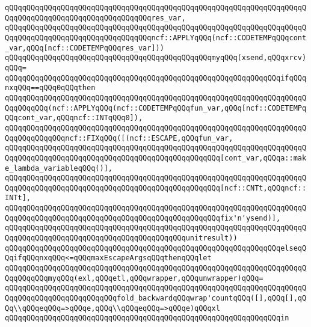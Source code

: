 \verb|qQQqqQQqqQQqqQQqqQQqqQQqqQQqqQQqqQQqqQQqqQQqqQQqqQQqqQQqqQQqqQQqqQQqqQQqqQQqqQQqqQQqqQQqqQQqqQQqqQQqqQQqres_var,|\newline
\verb|qQQqqQQqqQQqqQQqqQQqqQQqqQQqqQQqqQQqqQQqqQQqqQQqqQQqqQQqqQQqqQQqqQQqqQQqqQQqqQQqqQQqqQQqqQQqqQQqqQQqqQQqncf::APPLYqQQq(ncf::CODETEMPqQQqcont_var,qQQq[ncf::CODETEMPqQQqres_var]))|\newline
\verb|qQQqqQQqqQQqqQQqqQQqqQQqqQQqqQQqqQQqqQQqqQQqqQQqmyqQQq(xsend,qQQqxrcv)qQQq=|\newline
\verb|qQQqqQQqqQQqqQQqqQQqqQQqqQQqqQQqqQQqqQQqqQQqqQQqqQQqqQQqqQQqqQQqifqQQqnxqQQq==qQQq0qQQqthen|\newline
\verb|qQQqqQQqqQQqqQQqqQQqqQQqqQQqqQQqqQQqqQQqqQQqqQQqqQQqqQQqqQQqqQQqqQQqqQQqqQQqqQQq(ncf::APPLYqQQq(ncf::CODETEMPqQQqfun_var,qQQq[ncf::CODETEMPqQQqcont_var,qQQqncf::INTqQQq0]),|\newline
\verb|qQQqqQQqqQQqqQQqqQQqqQQqqQQqqQQqqQQqqQQqqQQqqQQqqQQqqQQqqQQqqQQqqQQqqQQqqQQqqQQqqQQqncf::FIXqQQq([(ncf::ESCAPE,qQQqfun_var,|\newline
\verb|qQQqqQQqqQQqqQQqqQQqqQQqqQQqqQQqqQQqqQQqqQQqqQQqqQQqqQQqqQQqqQQqqQQqqQQqqQQqqQQqqQQqqQQqqQQqqQQqqQQqqQQqqQQqqQQqqQQqqQQq[cont_var,qQQqa::make_lambda_variableqQQq()],|\newline
\verb|qQQqqQQqqQQqqQQqqQQqqQQqqQQqqQQqqQQqqQQqqQQqqQQqqQQqqQQqqQQqqQQqqQQqqQQqqQQqqQQqqQQqqQQqqQQqqQQqqQQqqQQqqQQqqQQqqQQqqQQq[ncf::CNTt,qQQqncf::INTt],|\newline
\verb|qQQqqQQqqQQqqQQqqQQqqQQqqQQqqQQqqQQqqQQqqQQqqQQqqQQqqQQqqQQqqQQqqQQqqQQqqQQqqQQqqQQqqQQqqQQqqQQqqQQqqQQqqQQqqQQqqQQqqQQqfix'n'ysend)],|\newline
\verb|qQQqqQQqqQQqqQQqqQQqqQQqqQQqqQQqqQQqqQQqqQQqqQQqqQQqqQQqqQQqqQQqqQQqqQQqqQQqqQQqqQQqqQQqqQQqqQQqqQQqqQQqqQQqqQQqunitresult))|\newline
\verb|qQQqqQQqqQQqqQQqqQQqqQQqqQQqqQQqqQQqqQQqqQQqqQQqqQQqqQQqqQQqqQQqelseqQQqifqQQqnxqQQq<=qQQqmaxEscapeArgsqQQqthenqQQqlet|\newline
\verb|qQQqqQQqqQQqqQQqqQQqqQQqqQQqqQQqqQQqqQQqqQQqqQQqqQQqqQQqqQQqqQQqqQQqqQQqqQQqqQQqmyqQQq(exl,qQQqetl,qQQqwrapper,qQQqunwrapper)qQQq=|\newline
\verb|qQQqqQQqqQQqqQQqqQQqqQQqqQQqqQQqqQQqqQQqqQQqqQQqqQQqqQQqqQQqqQQqqQQqqQQqqQQqqQQqqQQqqQQqqQQqqQQqfold_backwardqQQqwrap'countqQQq([],qQQq[],qQQq\\qQQqeqQQq=>qQQqe,qQQq\\qQQqeqQQq=>qQQqe)qQQqxl|\newline
\verb|qQQqqQQqqQQqqQQqqQQqqQQqqQQqqQQqqQQqqQQqqQQqqQQqqQQqqQQqqQQqqQQqin|\newline
